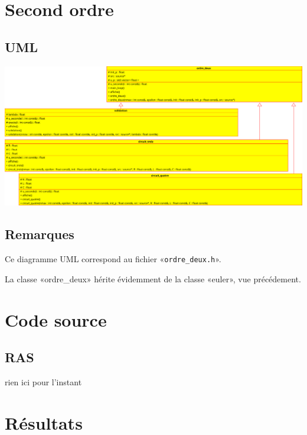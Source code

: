 \documentclass{report}
\begin{document}
\chapter{Second ordre}
    \begin{multicols}{2}
        \section{UML}
            \includegraphics[width=\linewidth+\linewidth,angle=90]{images/ordre_deux}

        \section{Remarques}
            Ce diagramme UML correspond au fichier «\verb|ordre_deux.h|».

            La classe «ordre\_deux» hérite évidemment de la classe «euler», vue précédement.
    \end{multicols}



\appendix
\chapter{Code source}
\section{RAS}
rien ici pour l’instant

\chapter{Résultats}

\end{document}
